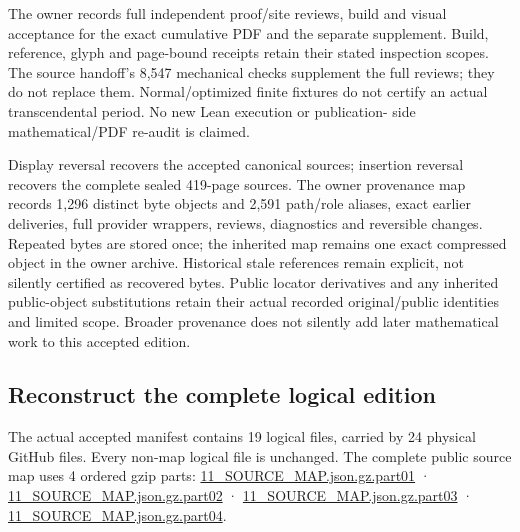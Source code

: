 \documentclass[
]{article}
\begin{document}
The owner records full independent proof/site reviews, build and visual
acceptance for the exact cumulative PDF and the separate supplement.
Build, reference, glyph and page-bound receipts retain their stated
inspection scopes. The source handoff's 8,547 mechanical checks
supplement the full reviews; they do not replace them. Normal/optimized
finite fixtures do not certify an actual transcendental period. No new
Lean execution or publication- side mathematical/PDF re-audit is
claimed.

Display reversal recovers the accepted canonical sources; insertion
reversal recovers the complete sealed 419-page sources. The owner
provenance map records 1,296 distinct byte objects and 2,591 path/role
aliases, exact earlier deliveries, full provider wrappers, reviews,
diagnostics and reversible changes. Repeated bytes are stored once; the
inherited map remains one exact compressed object in the owner archive.
Historical stale references remain explicit, not silently certified as
recovered bytes. Public locator derivatives and any inherited
public-object substitutions retain their actual recorded original/public
identities and limited scope. Broader provenance does not silently add
later mathematical work to this accepted edition.

\subsection{Reconstruct the complete logical
edition}\label{reconstruct-the-complete-logical-edition-1}

The actual accepted manifest contains 19 logical files, carried by 24
physical GitHub files. Every non-map logical file is unchanged. The
complete public source map uses 4 ordered gzip parts:
\href{https://github.com/KokunoYumeto/zeta-function-research-reader/blob/main/workbenches/splitzero-tandem/continuations/20260915-native-conductor-continuation/11_SOURCE_MAP.json.gz.part01}{11\_SOURCE\_MAP.json.gz.part01}
·
\href{https://github.com/KokunoYumeto/zeta-function-research-reader/blob/main/workbenches/splitzero-tandem/continuations/20260915-native-conductor-continuation/11_SOURCE_MAP.json.gz.part02}{11\_SOURCE\_MAP.json.gz.part02}
·
\href{https://github.com/KokunoYumeto/zeta-function-research-reader/blob/main/workbenches/splitzero-tandem/continuations/20260915-native-conductor-continuation/11_SOURCE_MAP.json.gz.part03}{11\_SOURCE\_MAP.json.gz.part03}
·
\href{https://github.com/KokunoYumeto/zeta-function-research-reader/blob/main/workbenches/splitzero-tandem/continuations/20260915-native-conductor-continuation/11_SOURCE_MAP.json.gz.part04}{11\_SOURCE\_MAP.json.gz.part04}.
\end{document}
